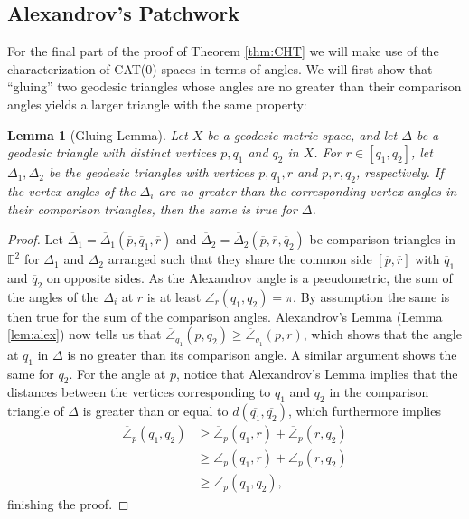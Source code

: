 \documentclass[11pt, a4paper, oneside]{memoir}
\theoremstyle{plain}\newtheorem{theorem}[subsection]{Theorem}
\newtheorem{lemma}[subsection]{Lemma}
\theoremstyle{definition}
\newcommand{\E}{\mathbb{E}}
\begin{document}
\subsection{Alexandrov's Patchwork}
For the final part of the proof of Theorem \ref{thm:CHT} we will make use of the characterization of CAT(0) spaces in terms of angles.
We will first show that ``gluing'' two geodesic triangles whose angles are no greater than their comparison angles yields a larger triangle with the same property:
\begin{lemma}[Gluing Lemma]\label{lem:gluing}
    Let \(X\) be a geodesic metric space, and let \(\Delta\) be a geodesic triangle with distinct vertices \(p,q_1\) and \(q_2\) in \(X\).
    For \(r\in[q_1,q_2]\), let \(\Delta_1,\Delta_2\) be the geodesic triangles with vertices \(p,q_1,r\) and \(p,r,q_2\), respectively.
    If the vertex angles of the \(\Delta_i\) are no greater than the corresponding vertex angles in their comparison triangles, then the same is true for \(\Delta\).
\end{lemma}
\begin{proof}
    Let \(\overline{\Delta}_1=\overline{\Delta}_1(\overline{p},\overline{q}_1,\overline{r})\) and \(\overline{\Delta}_2=\overline{\Delta}_2(\overline{p},\overline{r},\overline{q}_2)\) be comparison triangles in \(\E^2\) for \(\Delta_1\) and \(\Delta_2\) arranged such that they share the common side \([\overline{p},\overline{r}]\) with \(\overline{q}_1\) and \(\overline{q}_2\) on opposite sides.
    As the Alexandrov angle is a pseudometric, the sum of the angles of the \(\Delta_i\) at \(r\) is at least \(\angle_r(q_1,q_2)=\pi\). 
    By assumption the same is then true for the sum of the comparison angles.
    Alexandrov's Lemma (Lemma \ref{lem:alex}) now tells us that \(\overline{\angle}_{q_1}(p,q_2)\geq \overline{\angle}_{q_1}(p,r)\), which shows that the angle at \(q_1\) in \(\Delta\) is no greater than its comparison angle.
    A similar argument shows the same for \(q_2\).
    For the angle at \(p\), notice that Alexandrov's Lemma implies that the distances between the vertices corresponding to \(q_1\) and \(q_2\) in the comparison triangle of \(\Delta\) is greater than or equal to \(d(\overline{q_1},\overline{q_2})\), which furthermore implies
\begin{align*}
    \overline{\angle}_p(q_1,q_2)&\geq \overline{\angle}_p(q_1,r)+\overline{\angle}_p(r,q_2)\\
    &\geq \angle_p(q_1,r)+\angle_p(r,q_2)\tag{by assumption}\\
    &\geq \angle_p(q_1,q_2),\tag{by the triangle inequality}
\end{align*}
finishing the proof.
\end{proof}
\end{document}
